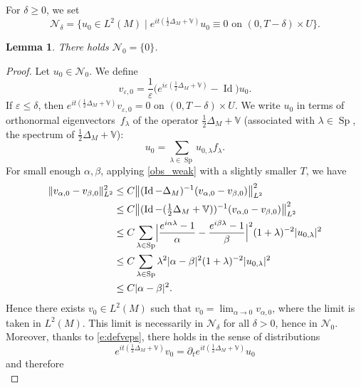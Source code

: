 \documentclass[JEP,XML,SOM,Unicode,published]{cedram}
\let\mathcal\mathscr
\let\sep\mid
\let\epsilon\varepsilon
\DeclareMathOperator{\Id}{Id}
\DeclareMathOperator{\Sp}{Sp}
\theoremstyle{plain}
\newtheorem{lemma}[theorem]{Lemma}
\theoremstyle{definition}
\def\bbV{{\mathbb V}}
\begin{document}
For $\delta\geq 0$, we set
\begin{equation*}
\mathcal{N}_\delta=\bigl\{u_0\in L^2(M) \sep e^{it(\frac{1}{2}\Delta_M+\bbV)}u_0\equiv0 \text{ on } (0,T-\delta)\times U \bigr\}.
\end{equation*}
\begin{lemma} \label{l:blrlemma}
There holds $\mathcal{N}_0=\{0\}$.
\end{lemma}
\begin{proof}
Let $u_0\in \mathcal{N}_0$. We define
\begin{equation} \label{e:defveps}
v_{\epsilon,0}=\frac{1}{\epsilon}\bigl(e^{i\epsilon(\frac{1}{2}\Delta_M+\bbV)}-\Id \bigr)u_0.
\end{equation}
If $\epsilon\leq \delta$, then $e^{it(\frac{1}{2}\Delta_M+\bbV)}v_{\epsilon,0}=0$ on $(0,T-\delta)\times U$. We write $u_0$ in terms of orthonormal eigenvectors~$f_\lambda$ of the operator $\frac12\Delta_M+\bbV$ (associated with $\lambda\in \Sp$, the spectrum of $\frac12\Delta_M+\bbV$):
\begin{equation*}
u_0=\sum_{\lambda\in\Sp} u_{0,\lambda}f_\lambda.
\end{equation*}
For small enough $\alpha,\beta$, applying \eqref{obs_weak} with a slightly smaller $T$, we have
\begin{align*}
\|v_{\alpha,0}-v_{\beta,0}\|^2_{L^2}&\leq C \bigl\|(\Id-\Delta_M)^{-1}(v_{\alpha,0}-v_{\beta,0})\bigr\|^2_{L^2} \\
&\leq C \bigl\|(\Id-(\tfrac12\Delta_M+\bbV))^{-1}(v_{\alpha,0}-v_{\beta,0})\bigr\|^2_{L^2} \\
&\leq C\sum_{\lambda\in\Sp}\Bigl|\frac{e^{i\alpha\lambda}-1}{\alpha}-\frac{e^{i\beta\lambda}-1}{\beta} \Bigr |^2(1+\lambda)^{-2}|u_{0,\lambda}|^2 \\
&\leq C\sum_{\lambda\in\Sp}\lambda^2|\alpha-\beta|^2(1+\lambda)^{-2}|u_{0,\lambda}|^2 \\
&\leq C|\alpha-\beta|^2.
\end{align*}
Hence there exists $v_0\in L^2(M)$ such that $v_0=\lim_{\alpha\to 0}v_{\alpha,0}$, where the limit is taken in $L^2(M)$. This limit is necessarily in $\mathcal{N}_\delta$ for all $\delta>0$, hence in $\mathcal{N}_0$. Moreover, thanks to \eqref{e:defveps}, there holds in the sense of distributions
\begin{equation*}
e^{it(\frac{1}{2}\Delta_M+\bbV)}v_0=\partial_te^{it(\frac{1}{2}\Delta_M+\bbV)}u_0
\end{equation*}
and therefore
\begin{equation*}

\end{equation*}
\end{proof}
\end{document}
